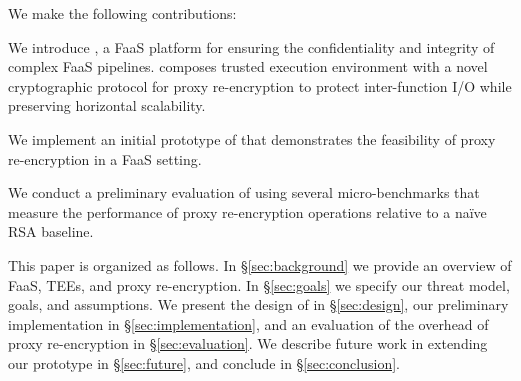 


%
We make the following contributions:
%
\begin{widelist}
\item We introduce \SystemName, a FaaS platform for ensuring the
    confidentiality and integrity of complex FaaS pipelines.
    \SystemName composes trusted execution environment with a novel
    cryptographic protocol for proxy re-encryption to protect inter-function
    I/O while preserving horizontal scalability.

\item We implement an initial prototype of \SystemName that demonstrates the
    feasibility of proxy re-encryption in a FaaS setting.

\item We conduct a preliminary evaluation of \SystemName using several
    micro-benchmarks that measure the performance of proxy re-encryption 
    operations relative to a na\"{i}ve RSA baseline.
\end{widelist}


%
This paper is organized as follows.
%
In \S\ref{sec:background} we provide an overview of FaaS, TEEs, and proxy
re-encryption.
%
In \S\ref{sec:goals} we specify our threat model, goals, and assumptions.
%
We present the design of \SystemName in \S\ref{sec:design}, our preliminary
implementation in \S\ref{sec:implementation}, and an evaluation of the overhead
of proxy re-encryption in \S\ref{sec:evaluation}.
%
We describe future work in extending our prototype in \S\ref{sec:future}, and
conclude in \S\ref{sec:conclusion}.
